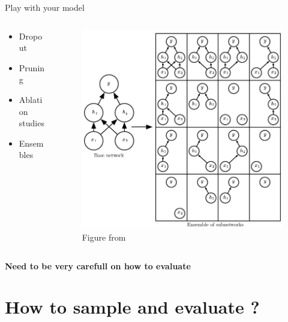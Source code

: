 \documentclass{irdbeamer}
\let\oldcite=\cite
\renewcommand{\cite}[1]{\textcolor[rgb]{.5,.5,.7}{\oldcite{#1}}}
\begin{document}
\begin{frame}{Play with your model}
    \begin{columns}
        \begin{column}{.5\linewidth}
            \begin{itemize}
                \item Dropout
                \item Pruning
                \item Ablation studies
                \item Ensembles
            \end{itemize}
        \end{column}
        \begin{column}{.5\linewidth}
            \begin{figure}
            \centering
    \includegraphics[width=.7\textwidth]{./figs/dropout.png}%
                \caption{\tiny Figure from \cite{goodfellow2016deep}}
            \end{figure}
        \end{column}
    \end{columns}
\end{frame}

\begin{frame}{}
    \centering
    \textbf{Need to be very carefull on how to evaluate}
\end{frame}

\section{How to sample and evaluate ?}
\end{document}
